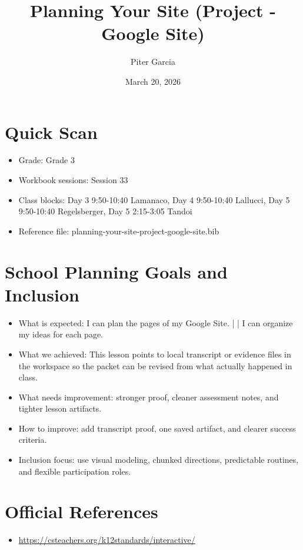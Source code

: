 \documentclass[11pt]{article}
\title{Planning Your Site (Project - Google Site)}
\author{Piter Garcia}
\date{March 20, 2026}
\begin{document}
\maketitle
\section*{Quick Scan}
\begin{itemize}[leftmargin=*]
\item Grade: Grade 3
\item Workbook sessions: Session 33
\item Class blocks: Day 3 9:50-10:40 Lamanaco, Day 4 9:50-10:40 Lallucci, Day 5 9:50-10:40 Regelsberger, Day 5 2:15-3:05 Tandoi
\item Reference file: planning-your-site-project-google-site.bib
\end{itemize}
\section*{School Planning Goals and Inclusion}
\begin{itemize}[leftmargin=*]
\item What is expected: I can plan the pages of my Google Site. | | I can organize my ideas for each page.
\item What we achieved: This lesson points to local transcript or evidence files in the workspace so the packet can be revised from what actually happened in class.
\item What needs improvement: stronger proof, cleaner assessment notes, and tighter lesson artifacts.
\item How to improve: add transcript proof, one saved artifact, and clearer success criteria.
\item Inclusion focus: use visual modeling, chunked directions, predictable routines, and flexible participation roles.
\end{itemize}
\section*{Official References}
\begin{itemize}[leftmargin=*]
\item \url{https://csteachers.org/k12standards/interactive/}

\end{itemize}
\end{document}
